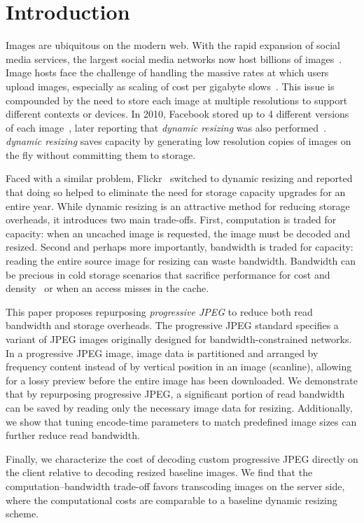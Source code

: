 \section{Introduction}
Images are ubiquitous on the modern web. 
With the rapid expansion of social media services, the largest social media networks now host billions of images~\cite{huang2013analysis}.
Image hosts face the challenge of handling the massive rates at which users upload images, especially as scaling of cost per gigabyte slows~\cite{gupta-mascots14}. 
This issue is compounded by the need to store each image at multiple resolutions to support different contexts or devices. 
In 2010, Facebook stored up to 4 different versions of each image~\cite{beaver2010finding}, later reporting that \emph{dynamic resizing} was also performed~\cite{huang2013analysis}.
\emph{dynamic resizing} saves capacity by generating low resolution copies of images on the fly without committing them to storage.

Faced with a similar problem, Flickr~\cite{flickr} switched to dynamic resizing and reported that doing so helped to eliminate the need for storage capacity upgrades for an entire year. 
While dynamic resizing is an attractive method for reducing storage overheads, it introduces two main trade-offs. 
First, computation is traded for capacity: when an uncached image is requested, the image must be decoded and resized.
Second and perhaps more importantly, bandwidth is traded for capacity: reading the entire source image for resizing can waste bandwidth.
Bandwidth can be precious in cold storage scenarios that sacrifice performance for cost and density~\cite{black2016feeding} or when an access misses in the cache.

This paper proposes repurposing \emph{progressive JPEG} to reduce both read bandwidth and storage overheads.
%
The progressive JPEG standard specifies a variant of JPEG images originally designed for bandwidth-constrained networks.
In a progressive JPEG image, image data is partitioned and arranged by frequency content instead of by vertical position in an image (scanline), allowing for a lossy preview before the entire image has been downloaded.
We demonstrate that by repurposing progressive JPEG, a significant portion of read bandwidth can be saved by reading only the necessary image data for resizing.
Additionally, we show that tuning encode-time parameters to match predefined image sizes can further reduce read bandwidth.

Finally, we characterize the cost of decoding custom progressive JPEG directly on the client relative to decoding resized baseline images. 
We find that the computation--bandwidth trade-off favors transcoding images on the server side, where the computational costs are comparable to a baseline dynamic resizing scheme.
